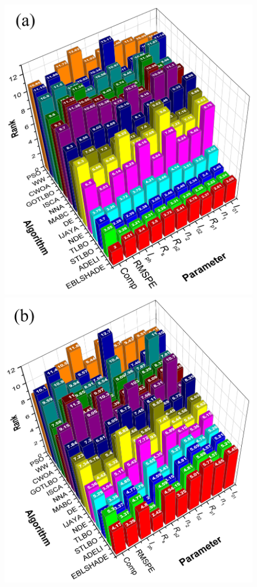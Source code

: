 \documentclass[a4paper,fleqn]{cas-dc}
\begin{document}
\begin{figure}[]
	\centering
		\includegraphics[width=.8\columnwidth]{Friedman}
        \includegraphics[width=.8\columnwidth]{FriedmanAlignedRank}

\end{figure}
\end{document}
